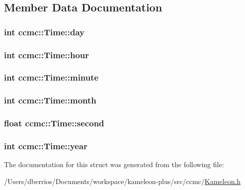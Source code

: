 \subsection{Member Data Documentation}
\hypertarget{structccmc_1_1_time_aadc5355945380825c132e4c1cddcb24f}{
\subsubsection[{day}]{\setlength{\rightskip}{0pt plus 5cm}int {\bf ccmc::Time::day}}}
\label{structccmc_1_1_time_aadc5355945380825c132e4c1cddcb24f}
\hypertarget{structccmc_1_1_time_aacdc28bb90a2c42e0b266a596220ef40}{
\subsubsection[{hour}]{\setlength{\rightskip}{0pt plus 5cm}int {\bf ccmc::Time::hour}}}
\label{structccmc_1_1_time_aacdc28bb90a2c42e0b266a596220ef40}
\hypertarget{structccmc_1_1_time_a163cc0bbdcf86f8a009a26d3c2764f17}{
\subsubsection[{minute}]{\setlength{\rightskip}{0pt plus 5cm}int {\bf ccmc::Time::minute}}}
\label{structccmc_1_1_time_a163cc0bbdcf86f8a009a26d3c2764f17}
\hypertarget{structccmc_1_1_time_a837bd8b4d92b602f60f99741270515d2}{
\subsubsection[{month}]{\setlength{\rightskip}{0pt plus 5cm}int {\bf ccmc::Time::month}}}
\label{structccmc_1_1_time_a837bd8b4d92b602f60f99741270515d2}
\hypertarget{structccmc_1_1_time_a569557baed8e5bf1e30cea22aa4a76c9}{
\subsubsection[{second}]{\setlength{\rightskip}{0pt plus 5cm}float {\bf ccmc::Time::second}}}
\label{structccmc_1_1_time_a569557baed8e5bf1e30cea22aa4a76c9}
\hypertarget{structccmc_1_1_time_a5f1d2d7bf202a400b3a101645f93c1a0}{
\subsubsection[{year}]{\setlength{\rightskip}{0pt plus 5cm}int {\bf ccmc::Time::year}}}
\label{structccmc_1_1_time_a5f1d2d7bf202a400b3a101645f93c1a0}


The documentation for this struct was generated from the following file:\begin{DoxyCompactItemize}
\item 
/Users/dberrios/Documents/workspace/kameleon-\/plus/src/ccmc/\hyperlink{_kameleon_8h}{Kameleon.h}\end{DoxyCompactItemize}
